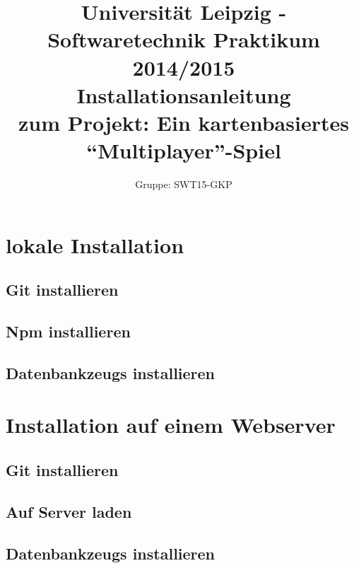 \documentclass[11pt,a4paper]{article}
\author{Gruppe: SWT15-GKP}
\title{Universität Leipzig - Softwaretechnik Praktikum 2014/2015 \\  Installationsanleitung \\ zum Projekt: Ein kartenbasiertes “Multiplayer”-Spiel}
\begin{document}
\maketitle

\tableofcontents

\clearpage

\section{lokale Installation}
\subsection{Git installieren}
\subsection{Npm installieren}
\subsection{Datenbankzeugs installieren}

\section{Installation auf einem Webserver}
\subsection{Git installieren}
\subsection{Auf Server laden}
\subsection{Datenbankzeugs installieren}
\end{document}
